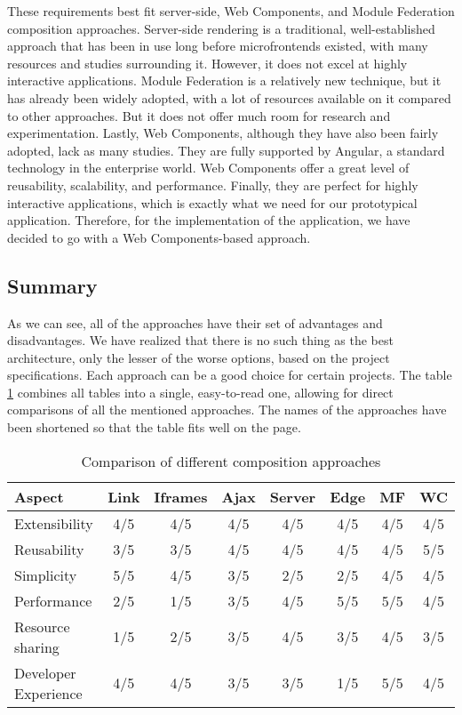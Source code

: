 \noindent
These requirements best fit server-side, Web Components, and Module Federation composition approaches. Server-side rendering is a traditional, well-established approach that has been in use long before microfrontends existed, with many resources and studies surrounding it. However, it does not excel at highly interactive applications. Module Federation is a relatively new technique, but it has already been widely adopted, with a lot of resources available on it compared to other approaches. But it does not offer much room for research and experimentation. Lastly, Web Components, although they have also been fairly adopted, lack as many studies. They are fully supported by Angular, a standard technology in the enterprise world. Web Components offer a great level of reusability, scalability, and performance. Finally, they are perfect for highly interactive applications, which is exactly what we need for our prototypical application. Therefore, for the implementation of the application, we have decided to go with a Web Components-based approach.

\subsection{Summary}
As we can see, all of the approaches have their set of advantages and disadvantages. We have realized that there is no such thing as the best architecture, only the lesser of the worse options, based on the project specifications. Each approach can be a good choice for certain projects. The table \ref{table:composition-comparison} combines all tables into a single, easy-to-read one, allowing for direct comparisons of all the mentioned approaches. The names of the approaches have been shortened so that the table fits well on the page.
\begin{table}[h]
  \centering
  \begin{tabular}{|p{3cm}|c|c|c|c|c|c|c|}
    \hline
      \textbf{Aspect} & \textbf{Link} & \textbf{Iframes} & \textbf{Ajax} & \textbf{Server} & \textbf{Edge} & \textbf{MF} & \textbf{WC} \\
    \hline
      Extensibility & 4/5 & 4/5 & 4/5 & 4/5 & 4/5 & 4/5 & 4/5 \\
    \hline
      Reusability & 3/5 & 3/5 & 4/5 & 4/5 & 4/5 & 4/5 & 5/5 \\
    \hline
      Simplicity & 5/5 & 4/5 & 3/5 & 2/5 & 2/5 & 4/5 & 4/5 \\
    \hline
      Performance & 2/5 & 1/5 & 3/5 & 4/5 & 5/5 & 5/5 & 4/5 \\
    \hline
      Resource sharing & 1/5 & 2/5 & 3/5 & 4/5 & 3/5 & 4/5 & 3/5 \\
    \hline
      Developer Experience & 4/5 & 4/5 & 3/5 & 3/5 & 1/5 & 5/5 & 4/5 \\
    \hline
  \end{tabular}
  \caption{Comparison of different composition approaches}
  \label{table:composition-comparison}
\end{table}
